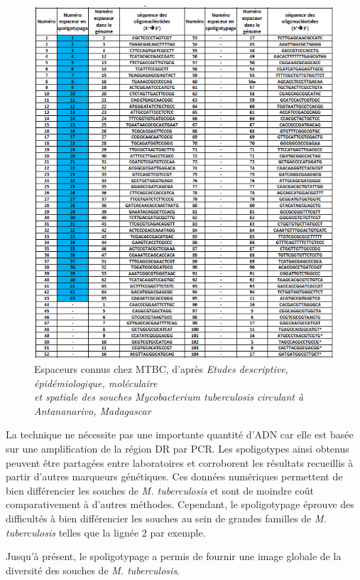 \documentclass[twoside,a4paper,11pt,frenchb,openany]{report}
\begin{document}
\begin{figure}[h!]
\centering
\includegraphics[scale=0.7]{spacer.png}
\caption{Espaceurs connus chez MTBC, d'après \textit{Etudes descriptive, épidémiologique, moléculaire\\ et spatiale des souches Mycobacterium tuberculosis circulant à Antananarivo, Madagascar}}
\end{figure}

La technique ne nécessite pas une importante quantité d'ADN car elle est basée sur une amplification de la région DR par PCR. Les spoligotypes ainsi obtenus peuvent être partagées entre laboratoires et corroborent les résultats recueillis à partir d'autres marqueurs génétiques. Ces données numériques permettent de bien différencier les souches de \textit{M. tuberculosis} et sont de moindre coût comparativement à d'autres méthodes. Cependant, le spoligotypage éprouve des difficultés à bien différencier les souches au sein de grandes familles de \textit{M. tuberculosis} telles que la lignée 2 par exemple.

Jusqu'à présent, le spoligotypage a permis de fournir une image globale de la diversité des souches de \textit{M. tuberculosis}.
\end{document}
